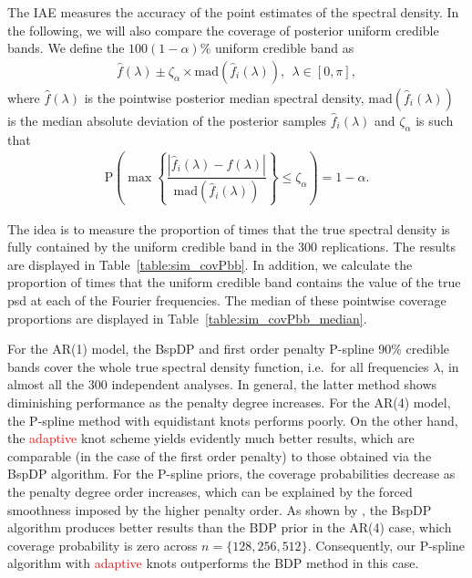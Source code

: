 \documentclass[twocolumn,final]{svjour3}
\newcommand{\pmr}{ \color{blue}}
\begin{document}

The IAE measures the accuracy of the  point estimates of the spectral density. In the following, we will also compare the coverage of posterior uniform credible bands.
We define the $100(1-\alpha)\%$ uniform credible band as
\begin{align*}
\widehat{f}(\lambda) \pm \zeta_\alpha \times \text{mad} \left( \widehat{f}_i (\lambda) \right), \:\: \lambda \in [0,\pi],
\end{align*}
where $\widehat{f}(\lambda)$ is the pointwise posterior median spectral density, $\text{mad}( \widehat{f}_i (\lambda))$ is the median absolute deviation of the posterior samples $\widehat{f}_i (\lambda)$ and $\zeta_\alpha$ is such that
\begin{align*}
\text{P}\left( \max \left\{ \dfrac{|\widehat{f}_i (\lambda) - \widehat{f} (\lambda)|}{\text{mad}(\widehat{f}_i (\lambda))} \right\} \leq \zeta_{\alpha} \right) = 1 - \alpha.
\end{align*}

The idea is to measure the proportion of times that the true spectral density is fully contained by the uniform credible band in the 300 replications.  The results are displayed in Table~\ref{table:sim_covPbb}.  In addition, we calculate the proportion of times that the uniform credible band contains the value of the true psd
at each of the Fourier frequencies.  The median of these pointwise coverage proportions are displayed in Table~\ref{table:sim_covPbb_median}.

For the AR(1) model, the BspDP and first order penalty P-spline 90\% credible bands cover the whole true spectral density function, i.e.\ for all frequencies $\lambda$, in {\pmr almost} all the 300 independent analyses.  In general, the latter method shows diminishing  performance as the penalty degree increases.  For the AR(4) model, the P-spline method with equidistant knots performs poorly.  On the other hand, the \textcolor{red}{adaptive} knot scheme yields evidently much better results, which are comparable (in the case of the first order penalty) to those obtained via the BspDP algorithm.  %
For the P-spline priors, the coverage probabilities decrease as the penalty degree order increases, which can be explained by the forced smoothness imposed by the higher penalty order.  As shown by \cite{Edwards2019}, the BspDP algorithm produces better results than the BDP prior in the AR(4) case, which coverage probability is zero across $n=\{128,256,512\}$. Consequently, our P-spline algorithm with \textcolor{red}{adaptive} knots outperforms the BDP method in this case.
\end{document}
